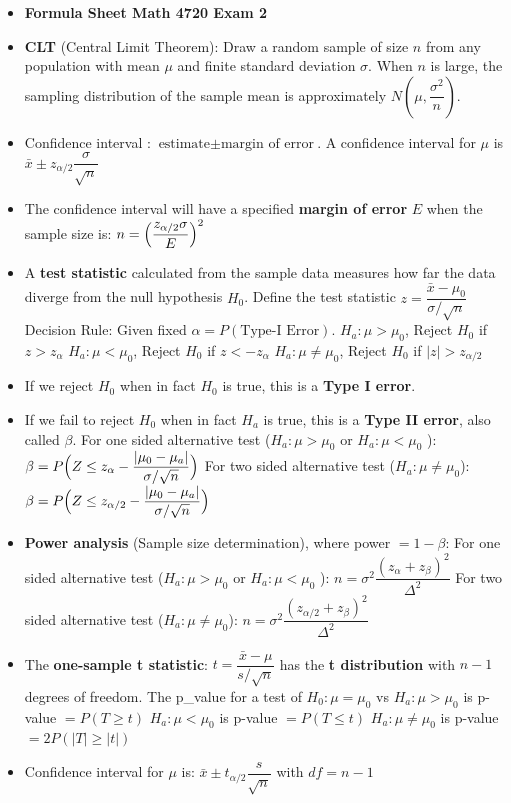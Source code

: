 \documentclass[twoside]{article}
\newcommand{\0}{\mathbf{0}}
\begin{document}
\begin{itemize}
\item[] \textbf{Formula Sheet\hspace{6.3cm} Math 4720\hspace{6.4cm} Exam 2}
\item \textbf{CLT} (Central Limit Theorem): Draw a random sample of size $n$ from any population with mean $\mu$ and finite standard deviation $\sigma$. When $n$ is large, the sampling distribution of the sample mean is approximately $N(\mu,\dfrac{\sigma^2}{n})$.
\item Confidence interval : $\textrm{estimate} \pm \textrm{margin of error}$. A confidence interval for $\mu$ is $\bar{x} \pm z_{\alpha/2}\dfrac{\sigma}{\sqrt{n}}$
\item The confidence interval will have a specified \textbf{margin of error} $E$ when the sample size is: $n=\Bigl(\dfrac{z_{\alpha/2}\sigma}{E}\Bigr)^2$
\item A \textbf{test statistic} calculated from the sample data measures how far the data diverge from the null hypothesis $H_0$. Define the test statistic $z=\dfrac{\bar{x}-\mu_0}{\sigma/\sqrt{n}}$
\subitem Decision Rule: Given fixed $\alpha=P(\textrm{Type-I Error})$.
\subsubitem $H_a: \mu > \mu_0$, Reject $H_0$ if $z>z_{\alpha}$
\subsubitem $H_a: \mu < \mu_0$, Reject $H_0$ if $z<-z_{\alpha}$
\subsubitem $H_a: \mu \neq \mu_0$, Reject $H_0$ if $|z|>z_{\alpha/2}$
\item If we reject $H_0$ when in fact $H_0$ is true, this is a \textbf{Type I error}.
\item If we fail to reject $H_0$ when in fact $H_a$ is true, this is a \textbf{Type II error}, also called $\beta$.
\subitem For one sided alternative test ($H_a:\mu>\mu_0$ or $H_a:\mu<\mu_0$ ): $\beta=P\Bigl(Z\leq z_\alpha-\dfrac{|\mu_0-\mu_a|}{\sigma/\sqrt{n}}\Bigr)$
\subitem For two sided alternative test ($H_a:\mu \neq \mu_0$): $\beta=P\Bigl(Z\leq z_{\alpha/2}-\dfrac{|\mu_0-\mu_a|}{\sigma/\sqrt{n}}\Bigr)$
\item \textbf{Power analysis} (Sample size determination), where power $= 1 - \beta$:
\subitem For one sided alternative test ($H_a:\mu>\mu_0$ or $H_a:\mu<\mu_0$ ): $n=\sigma^2\dfrac{(z_\alpha+z_\beta)^2}{\Delta^2}$
\subitem For two sided alternative test ($H_a:\mu \neq \mu_0$): $n=\sigma^2\dfrac{(z_{\alpha/2}+z_\beta)^2}{\Delta^2}$
\item The \textbf{one-sample t statistic}: $t=\dfrac{\bar{x}-\mu}{s/\sqrt{n}}$ has the \textbf{t distribution} with $n-1$ degrees of freedom.
\subitem The p\_value for a test of $H_0: \mu = \mu_0$ vs
\subsubitem $H_a: \mu > \mu_0$ is p-value $ = P(T\geq t)$
\subsubitem $H_a: \mu < \mu_0$ is p-value $ = P(T\leq t)$
\subsubitem $H_a: \mu \neq \mu_0$ is p-value $ = 2P(|T|\geq|t|)$
\item Confidence interval for $\mu$ is:
\subitem $\bar{x} \pm t_{\alpha/2}\dfrac{s}{\sqrt{n}}$ with $df=n-1$
\end{itemize}
\end{document}
